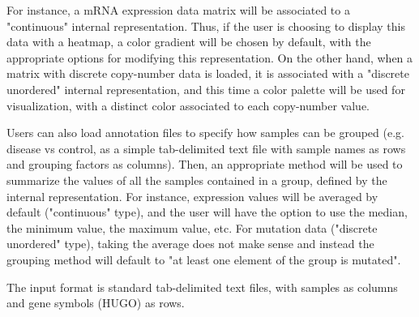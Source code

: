 \documentclass[a4,center,fleqn]{NAR}
\begin{document}
For instance, a mRNA expression data matrix will be associated to a
"continuous" internal representation. Thus, if the user is choosing to display
this data with a heatmap, a color gradient will be chosen by default, with the
appropriate options for modifying this representation. On the other hand, when a
matrix with discrete copy-number data is loaded, it is associated with a
"discrete unordered" internal representation, and this time a color palette will
be used for visualization, with a distinct color associated to each copy-number
value.

Users can also load annotation files to specify how samples can be grouped (e.g.
disease vs control, as a simple tab-delimited text file with sample names as rows and
grouping factors as columns). Then, an appropriate method will be used to summarize the
values of all the samples contained in a group, defined by the internal
representation. For instance, expression values will be averaged by default
("continuous" type), and the user will have the option to use the median, the
minimum value, the maximum value, etc. For mutation data ("discrete unordered"
type), taking the average does not make sense and instead the grouping method
will default to "at least one element of the group is mutated". 

\begin{table}
{The input format is standard tab-delimited text files, with samples as columns
and gene symbols (HUGO) as rows.}
\end{table}
\end{document}
